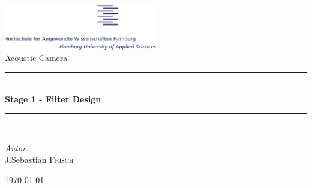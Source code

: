 \documentclass[12pt, a4paper]{article}
\begin{document}
		
		\begin{titlepage}
				
				\begin{center}
						
						\includegraphics[width=0.5\textwidth]{HawLogo.png}
						\\[1.5cm]
						\LARGE Acoustic Camera
						
						\newcommand{\HRule}{\rule{\linewidth}{0.5 mm}}
						\HRule \\[0.3cm]
						{\huge \bfseries Stage 1 - Filter Design} \\[0.3cm]
						\HRule \\[1.5cm]
						
						\begin{minipage}{0.4\textwidth}
								\begin{flushleft}
										\large \emph{Autor:}\\
										J.Sebastian \textsc{Frisch}
									\end{flushleft}
							\end{minipage}
						\hfill
						\begin{minipage}{0.4\textwidth}
%										
						\end{minipage}
						
						\vfill
						
						{\large \today}
					\end{center}
				
			\end{titlepage}
		
		\newpage
		\setcounter{page}{1}
		
\end{document}
